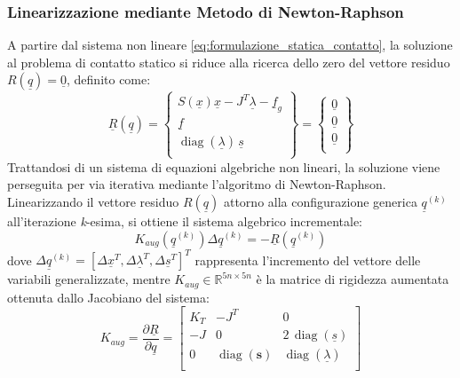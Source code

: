\subsubsection{Linearizzazione mediante Metodo di Newton-Raphson}
A partire dal sistema non lineare \eqref{eq:formulazione_statica_contatto}, la soluzione al problema di contatto statico si riduce alla ricerca dello zero del vettore residuo $R(\underline{q}) = \underline{0}$, definito come: 
\begin{equation} 
  \underline{R}(\underline{q}) = \left\{
  \begin{array}{c}
    S(\underline{x})\underline{x} - J^T\underline{\lambda} - \underline{f}_g\\
    \underline{f}\\
    \operatorname{diag}(\underline{\lambda})\, \underline{s}\\
  \end{array}\right\} = \left\{
  \begin{array}{c}
    \underline{0}\\
    \underline{0}\\
    \underline{0}\\
  \end{array}\right\}
\end{equation}
Trattandosi di un sistema di equazioni algebriche non lineari, la soluzione viene perseguita per via iterativa mediante l'algoritmo di Newton-Raphson. Linearizzando il vettore residuo $R(\underline{q})$ attorno alla configurazione generica $\underline{q}^{(k)}$ all'iterazione \textit{k}-esima, si ottiene il sistema algebrico incrementale: 
\begin{equation}
  K_{aug}(\underline{q}^{(k)})\Delta\underline{q}^{(k)} = - \underline{R}(\underline{q}^{(k)})
  \label{eq:sistema_lineare_aumentato}
\end{equation}
dove $\Delta\underline{q}^{(k)} = \left[ \Delta\underline{x}^T, \Delta\underline{\lambda}^T, \Delta\underline{s}^T\right]^T$ rappresenta l'incremento del vettore delle variabili generalizzate, mentre $K_{aug} \in \mathbb{R}^{5n \times 5n}$ è la matrice di rigidezza aumentata ottenuta dallo Jacobiano del sistema: 
\begin{equation}
  K_{aug} = \frac{\partial \underline{R}}{\partial \underline{q}} = \begin{bmatrix}
    K_T & -J^T & 0\\
    -J  &   0  & 2\,\operatorname{diag}(\underline{s})\\
    0   &   \operatorname{diag}(\mathbf{s})  & \operatorname{diag}(\underline{\lambda})\\  
  \end{bmatrix}
  \label{eq:matrice_rigidezza_aumentata}
\end{equation}
